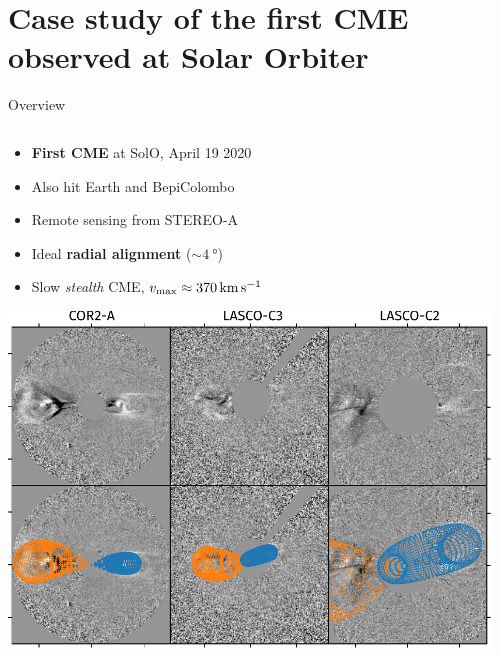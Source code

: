 \documentclass[10pt,aspectratio=169,usenames,dvipsnames]{beamer}
\newcommand{\maxt}{\ensuremath\text{max}}
\begin{document}
\section{Case study of the first CME observed at Solar Orbiter}

\begin{frame}{Overview}
    \begin{columns}
        \begin{column}{0.4\textwidth}
            \begin{itemize}
                \item \textbf{First CME} at SolO, April 19 2020
                \item Also hit Earth and BepiColombo
                \item Remote sensing from STEREO-A
                \item Ideal \textbf{radial alignment} ($\sim\SI{4}{\degree}$)
                \item Slow \textit{stealth} CME, $v_\maxt \approx \SI{370}{\kilo\meter\per\second}$
            \end{itemize}
            \vspace{2mm}
            \includegraphics[width=\textwidth]{plots/gcs_reconstruction.pdf}
        \end{column}
        \begin{column}{0.5\textwidth}
        	\vskip2mm

\end{column}
\end{columns}
\end{frame}
\end{document}
